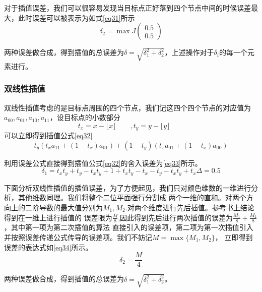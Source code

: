 \documentclass[UTF8,a4paper]{paper}\usepackage[utf8]{inputenc}\usepackage{algorithm}
\begin{document}
对于插值误差，我们可以很容易发现当目标点正好落到四个节点中间的时候误差最大，此时误差可以被表示为如式\ref{eq31}所示
\begin{equation}\delta_2 = \max J\begin{pmatrix}0.5 \\ 0.5 \end{pmatrix}\label{eq31}\end{equation}

两种误差做合成，得到插值的总误差为$\delta = \sqrt{\delta_1^2 + \delta_2^2}$，上述操作对于$\delta_i$的每一个元素进行。
\subsubsection{双线性插值}
双线性插值考虑的是目标点周围的四个节点，我们记这四个四个节点的对应值为$a_{00},a_{01},a_{10},a_{11}$，设目标点的小数部分
$$t_x = x - \biggl\lfloor x\biggr\rfloor\qquad, t_y = y - \biggl\lfloor y\biggr\rfloor\qquad$$
可以立即得到插值公式\ref{eq32}
\begin{equation} t_y(t_xa_{11} + (1-t_x)a_{01}) + (1-t_y)(t_xa_{01} + (1-t_x)a_{00})\label{eq32}\end{equation}

利用误差公式直接得到插值公式\ref{eq32}的舍入误差为\ref{eq33}所示。
\begin{equation} \delta_1 = t_xt_y + t_y - t_xt_y + 1 + t_xt_y  - t_x - t_y -t_xt_y + t_x \Delta = 0.5
\label{eq33}\end{equation}

下面分析双线性插值的插值误差，为了方便起见，我们只对颜色维数的一维进行分析，其他维数同理。我们将整个二位平面强行分割成
两个一维的直和。对两个方向上的二阶导数的最大值分别为$M_1,M_2$.对两个维度进行先后插值。参考书上结论得到在一维上进行插值的
误差限为$\frac{M}{8}$,因此得到先后进行两次插值的误差为$\frac{M_1}{8} + \frac{M_2}{8}$，其中第一项为第二次插值的算法
直接引入的误差项，第二项为第一次插值引入并按照误差传递公式传导的误差项。我们不妨记$M = \max\{M_1,M_2\}$，
立即得到误差的表达式如\ref{eq34}所示。\begin{equation}\delta_2 = \frac{M}{4}\label{eq34}\end{equation}

两种误差做合成，得到插值的总误差为$\delta = \sqrt{\delta_1^2 + \delta_2^2}$。
\end{document}
